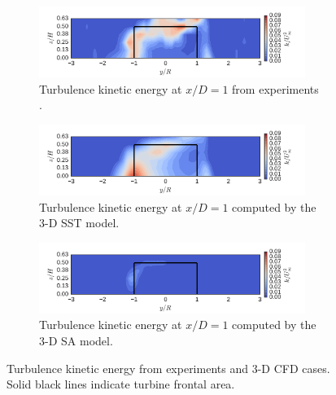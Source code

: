 \documentclass[aip,graphicx]{revtex4-1}
\begin{document}
\begin{figure}
    \centering
    \begin{subfigure}[b]{\textwidth}
        \centering

        \includegraphics[width=0.95\textwidth]{kcont_exp}

        \caption{Turbulence kinetic energy at $x/D=1$ from experiments
            \cite{Bachant2016-RVAT-Re-dep}.}

        \label{fig:kcont-exp}
    \end{subfigure}

    \begin{subfigure}[b]{\textwidth}
        \centering

        \includegraphics[width=0.95\textwidth]{kcont_kOmegaSST}

        \caption{Turbulence kinetic energy at $x/D=1$ computed by the 3-D SST
            model.}

        \label{fig:kcont-SST}
    \end{subfigure}

    \begin{subfigure}[b]{\textwidth}
        \centering

        \includegraphics[width=0.95\textwidth]{kcont_SpalartAllmaras}

        \caption{Turbulence kinetic energy at $x/D=1$ computed by the 3-D SA
            model.}

        \label{fig:kcont-SA}
    \end{subfigure}

    \caption{Turbulence kinetic energy from experiments and 3-D CFD cases. Solid
        black lines indicate turbine frontal area.}

    \label{fig:br-cfd-kcont}
\end{figure}
\end{document}
